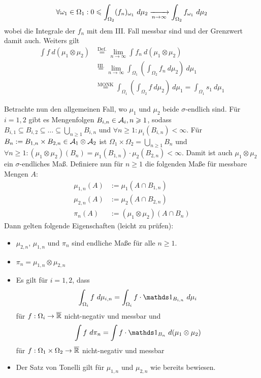 \begin{enumerate}[label=\Roman*.]
    $$\forall\omega_1\in\Omega_1:0\leq\int_{\Omega_2}(f_n)_{\omega_1}\ d\mu_2\nto{}{n\to\infty}\int_{\Omega_2}f_{\omega_1}\ d\mu_2$$
    wobei die Integrale der $f_n$ mit dem III. Fall messbar sind und der Grenzwert damit auch. Weiters gilt
    \begin{align*}
        \int f\ d(\mu_1\otimes\mu_2)&\overset{\text{Def.}}{=}\lim_{n\to\infty}\int f_n\ d(\mu_1\otimes\mu_2)\\
        &\overset{\text{III.}}{=}\lim_{n\to\infty}\int_{\Omega_1}\left(\int_{\Omega_2}f_n\ d\mu_2\right)\ d\mu_1\\
        &\overset{\text{MONK}}{=}\int_{\Omega_1}\left(\int_{\Omega_2}f\ d\mu_2\right)\ d\mu_1=\int_{\Omega_1}s_1\ d\mu_1
    \end{align*}
\end{enumerate}
    Betrachte nun den allgemeinen Fall, wo $\mu_1$ und $\mu_2$ beide $\sigma$-endlich sind.\newline
    F\"ur $i=1,2$ gibt es Mengenfolgen $B_{i,n}\in\mathcal{A}_i,n\geqslant1$, sodass $B_{i,1}\subseteq B_{i,2}\subseteq\hdots\subseteq\bigcup_{n\geq1}B_{i,n}$ und $\forall n\geq1:\mu_i(B_{i,n})<\infty$. F\"ur $B_n:=B_{1,n}\times B_{2,n}\in\mathcal{A}_1\otimes\mathcal{A}_2$ ist $\Omega_1\times\Omega_2=\bigcup_{n\geq1}B_n$ und $\forall n\geq1:(\mu_1\otimes\mu_2)(B_n)=\mu_1(B_{1,n})\cdot\mu_2(B_{2,n})<\infty$. Damit ist auch $\mu_1\otimes\mu_2$ ein $\sigma$-endliches Ma\ss{}. Definiere nun f\"ur $n\geq1$ die folgenden Ma\ss{}e f\"ur messbare Mengen $A$:
    \begin{align*}
        \mu_{1,n}(A)&:=\mu_1(A\cap B_{1,n}) \\
        \mu_{2,n}(A)&:=\mu_2(A\cap B_{2,n}) \\
        \pi_n(A)&:=(\mu_1\otimes\mu_2)(A\cap B_n)
    \end{align*}
    Dann gelten folgende Eigenschaften (leicht zu pr\"ufen):
    \begin{itemize}
        \item $\mu_{2,n}$, $\mu_{1,n}$ und $\pi_n$ sind endliche Ma\ss{}e f\"ur alle $n\geq1$.
        \item $\pi_n=\mu_{1,n}\otimes\mu_{2,n}$
        \item Es gilt f\"ur $i=1,2$, dass 
        \begin{equation*}
            \int_{\Omega_i}f\ d\mu_{i,n}=\int_{\Omega_i}f\cdot\ind{B_{i,n}}\ d\mu_i
        \end{equation*}
        f\"ur $f:\Omega_i\to\overline{\mathbb{R}}$ nicht-negativ und messbar und
        \begin{equation*}
            \int f\ d\pi_n=\int f\cdot\ind{B_n}\ d(\mu_1\otimes\mu_2)
        \end{equation*}
        f\"ur $f:\Omega_1\times\Omega_2\to\overline{\mathbb{R}}$ nicht-negativ und messbar
        \item Der Satz von Tonelli gilt f\"ur $\mu_{1,n}$ und $\mu_{2,n}$ wie bereits bewiesen.
    \end{itemize}
